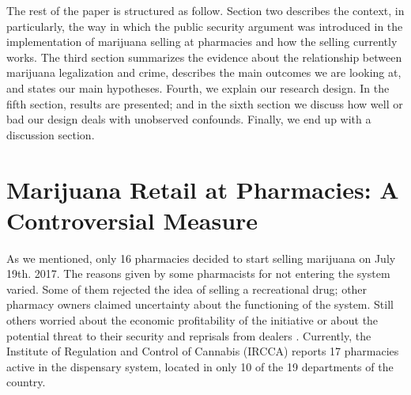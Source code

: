 \documentclass[11pt]{article}
\begin{document}
The rest of the paper is structured as follow. Section two describes the context, in particularly, the way in which the public security argument was introduced in the implementation of marijuana selling at pharmacies and how the selling currently works. The third section summarizes the evidence about the relationship between marijuana legalization and crime, describes the main outcomes we are looking at, and states our main hypotheses. Fourth, we explain our research design. In the fifth section, results are presented; and in the  sixth section we discuss how well or bad our design deals with unobserved confounds. Finally, we end up with a discussion section.

\section{Marijuana Retail at Pharmacies: A Controversial Measure}
As we mentioned, only 16 pharmacies decided to start selling marijuana on July 19th. 2017. The reasons given by some pharmacists for not entering the system varied. Some of them rejected the idea of selling a recreational drug; other pharmacy owners claimed uncertainty about the functioning of the system. Still others worried about the economic profitability of the initiative or about the potential threat to their security and reprisals from dealers \citep{boidi2016}. Currently, the Institute of Regulation and Control of Cannabis (IRCCA) reports 17 pharmacies active in the dispensary system, located in only 10 of the 19 departments of the country.
\end{document}
